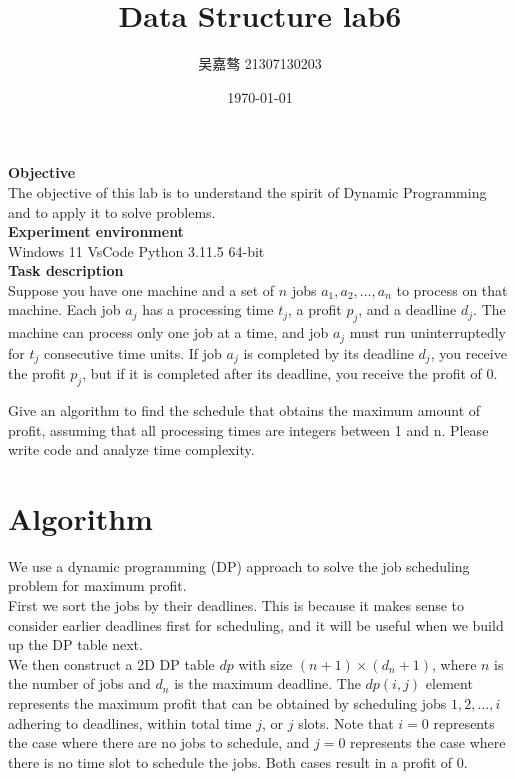 \documentclass[UTF8]{ctexart}
\title{\textbf{Data Structure lab6}}
\author{吴嘉骜 21307130203}
\date{\today}
\begin{document}
\maketitle

\noindent
\textbf {\large Objective}\\  The objective of this lab is to understand the spirit of Dynamic Programming and to apply it to solve problems.\\
\noindent
\textbf {\large Experiment environment} \\
   Windows 11 VsCode Python 3.11.5 64-bit\\

\setlength{\parindent}{0pt}
\textbf{\large Task description}\\
Suppose you have one machine and a set of $n$ jobs $a_1, a_2, \ldots , a_n$ to process
on that machine. Each job $a_j$ has a processing time $t_j$, a profit $p_j$, and a
deadline $d_j$. The machine can process only one job at a time, and job $a_j$ must
run uninterruptedly for $t_j$ consecutive time units. If job $a_j$ is completed by its
deadline $d_j$, you receive the profit $p_j$, but if it is completed after its deadline,
you receive the profit of 0.

Give an algorithm to find the schedule that obtains the maximum amount of
profit, assuming that all processing times are integers between 1 and n. Please
write code and analyze time complexity.
\section{Algorithm}
We use a dynamic programming (DP) approach to solve the job scheduling problem for maximum profit.\\
First we sort the jobs by their deadlines. This is because it makes sense to consider earlier deadlines first for scheduling, and it will be useful when we build up the DP table next.\\
We then construct a 2D DP table $dp$ with size $(n+1) \times (d_n+1)$, where $n$ is the number of jobs and $d_n$ is the maximum deadline. 
The $dp(i,j)$ element represents the maximum profit that can be obtained by scheduling jobs $1,2, \ldots, i$ adhering to deadlines, within total time $j$, or $j$ slots.
Note that $i=0$ represents the case where there are no jobs to schedule, and $j=0$ represents the case where there is no time slot to schedule the jobs.
Both cases result in a profit of 0.\\
\end{document}
